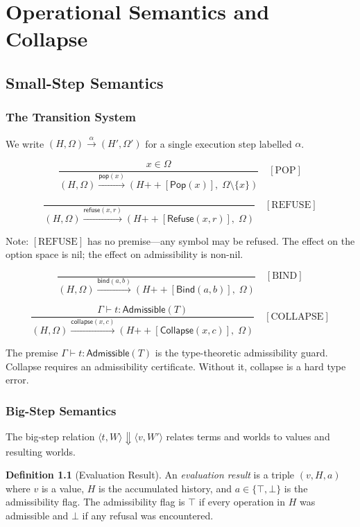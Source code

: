 \documentclass[12pt, a4paper, openany]{book}
\theoremstyle{plain}
\theoremstyle{definition}
\newtheorem{definition}[theorem]{Definition}
\theoremstyle{remark}
\newcommand{\Pop}{\mathsf{Pop}}
\newcommand{\Refuse}{\mathsf{Refuse}}
\newcommand{\Bind}{\mathsf{Bind}}
\newcommand{\Collapse}{\mathsf{Collapse}}
\newcommand{\Adm}{\mathsf{Admissible}}
\begin{document}
\part{Operational Semantics and Collapse}

\chapter{Small-Step Semantics}

\section{The Transition System}

We write $(H, \Omega) \xrightarrow{\alpha} (H', \Omega')$ for a single execution
step labelled $\alpha$.

\[
\frac{x \in \Omega}{(H, \Omega) \xrightarrow{\mathsf{pop}(x)} (H \mathbin{++} [\Pop(x)],\; \Omega \setminus \{x\})} \quad [\mathrm{POP}]
\]

\[
\frac{}{(H, \Omega) \xrightarrow{\mathsf{refuse}(x,r)} (H \mathbin{++} [\Refuse(x, r)],\; \Omega)} \quad [\mathrm{REFUSE}]
\]

Note: $[\mathrm{REFUSE}]$ has no premise---any symbol may be refused. The effect
on the option space is nil; the effect on admissibility is non-nil.

\[
\frac{}{(H, \Omega) \xrightarrow{\mathsf{bind}(a,b)} (H \mathbin{++} [\Bind(a, b)],\; \Omega)} \quad [\mathrm{BIND}]
\]

\[
\frac{\Gamma \vdash t : \Adm(T)}{(H, \Omega) \xrightarrow{\mathsf{collapse}(x,c)} (H \mathbin{++} [\Collapse(x, c)],\; \Omega)} \quad [\mathrm{COLLAPSE}]
\]

The premise $\Gamma \vdash t : \Adm(T)$ is the type-theoretic admissibility guard.
Collapse requires an admissibility certificate. Without it, collapse is a hard
type error.

\section{Big-Step Semantics}

The big-step relation $\langle t, W \rangle \Downarrow \langle v, W' \rangle$
relates terms and worlds to values and resulting worlds.

\begin{definition}[Evaluation Result]
An \emph{evaluation result} is a triple $(v, H, a)$ where $v$ is a value,
$H$ is the accumulated history, and $a \in \{\top, \bot\}$ is the admissibility
flag. The admissibility flag is $\top$ if every operation in $H$ was admissible
and $\bot$ if any refusal was encountered.
\end{definition}
\end{document}
